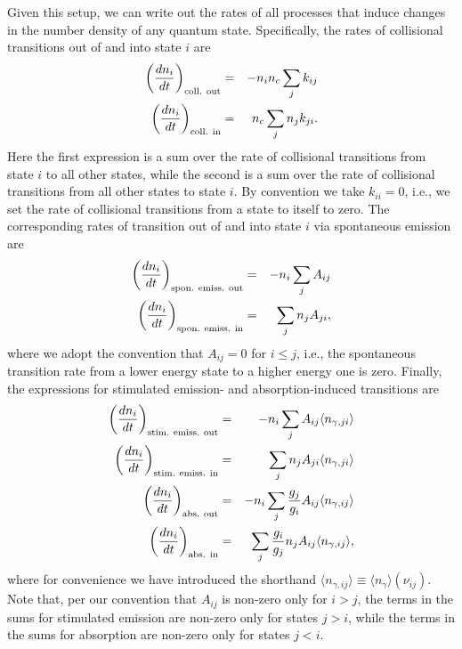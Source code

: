 Given this setup, we can write out the rates of all processes that induce changes in the number density of any quantum state. Specifically, the rates of collisional transitions out of and into state $i$ are
\begin{eqnarray}
\left(\frac{dn_i}{dt}\right)_{\rm coll.~out} & = & -n_i n_c \sum_j k_{ij} \\
\left(\frac{dn_i}{dt}\right)_{\rm coll.~in} & = & n_c \sum_j n_j k_{ji}.
\end{eqnarray}
Here the first expression is a sum over the rate of collisional transitions from state $i$ to all other states, while the second is a sum over the rate of collisional transitions from all other states to state $i$. By convention we take $k_{ii} = 0$, i.e., we set the rate of collisional transitions from a state to itself to zero. The corresponding rates of transition out of and into state $i$ via spontaneous emission are
\begin{eqnarray}
\left(\frac{dn_i}{dt}\right)_{\rm spon.~emiss.~out} & = & -n_i \sum_j A_{ij} \\
\left(\frac{dn_i}{dt}\right)_{\rm spon.~emiss.~in} & = & \sum_j n_j A_{ji},
\end{eqnarray}
where we adopt the convention that $A_{ij} = 0$ for $i \leq j$, i.e., the spontaneous transition rate from a lower energy state to a higher energy one is zero. Finally, the expressions for stimulated emission- and absorption-induced transitions are
\begin{eqnarray}
\left(\frac{dn_i}{dt}\right)_{\rm stim.~emiss.~out} & = & -n_i \sum_j A_{ij} \langle n_{\gamma,ji}\rangle \\
\left(\frac{dn_i}{dt}\right)_{\rm stim.~emiss.~in} & = & \sum_j n_j A_{ji} \langle n_{\gamma,ji}\rangle \\
\left(\frac{dn_i}{dt}\right)_{\rm abs.~out} & = & -n_i \sum_j \frac{g_j}{g_i} A_{ij} \langle n_{\gamma,ij}\rangle \\
\left(\frac{dn_i}{dt}\right)_{\rm abs.~in} & = & \sum_j \frac{g_i}{g_j} n_j A_{ij} \langle n_{\gamma,ij}\rangle,
\end{eqnarray}
where for convenience we have introduced the shorthand $\langle n_{\gamma,ij}\rangle \equiv \langle n_{\gamma}\rangle(\nu_{ij})$. Note that, per our convention that $A_{ij}$ is non-zero only for $i > j$, the terms in the sums for stimulated emission are non-zero only for states $j > i$, while the terms in the sums for absorption are non-zero only for states $j < i$.

